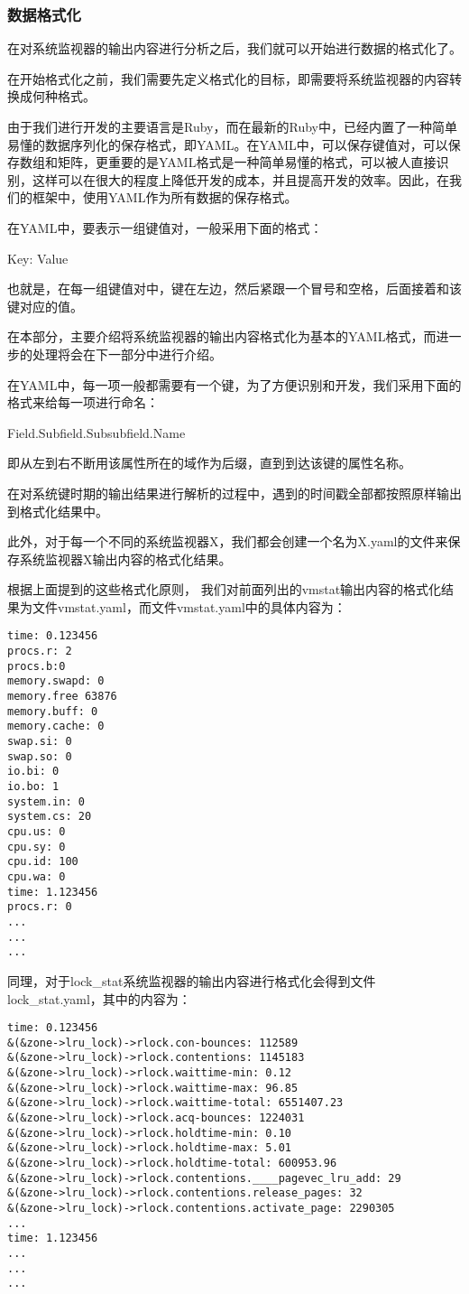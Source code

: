 \subsubsection{数据格式化}
在对系统监视器的输出内容进行分析之后，我们就可以开始进行数据的格式化了。

在开始格式化之前，我们需要先定义格式化的目标，即需要将系统监视器的内容转换成何种格式。

由于我们进行开发的主要语言是Ruby，而在最新的Ruby中，已经内置了一种简单易懂的数据序列化的保存格式，即YAML。在YAML中，可以保存键值对，可以保存数组和矩阵，更重要的是YAML格式是一种简单易懂的格式，可以被人直接识别，这样可以在很大的程度上降低开发的成本，并且提高开发的效率。因此，在我们的框架中，使用YAML作为所有数据的保存格式。

在YAML中，要表示一组键值对，一般采用下面的格式：
\begin{center}
Key: Value
\end{center}
也就是，在每一组键值对中，键在左边，然后紧跟一个冒号和空格，后面接着和该键对应的值。

在本部分，主要介绍将系统监视器的输出内容格式化为基本的YAML格式，而进一步的处理将会在下一部分中进行介绍。

在YAML中，每一项一般都需要有一个键，为了方便识别和开发，我们采用下面的格式来给每一项进行命名：
\begin{center}
Field.Subfield.Subsubfield.Name
\end{center}
即从左到右不断用该属性所在的域作为后缀，直到到达该键的属性名称。

在对系统键时期的输出结果进行解析的过程中，遇到的时间戳全部都按照原样输出到格式化结果中。

此外，对于每一个不同的系统监视器X，我们都会创建一个名为X.yaml的文件来保存系统监视器X输出内容的格式化结果。

根据上面提到的这些格式化原则， 我们对前面列出的vmstat输出内容的格式化结果为文件vmstat.yaml，而文件vmstat.yaml中的具体内容为：
{\footnotesize
\begin{verbatim}
time: 0.123456
procs.r: 2
procs.b:0
memory.swapd: 0
memory.free 63876
memory.buff: 0
memory.cache: 0
swap.si: 0
swap.so: 0
io.bi: 0
io.bo: 1
system.in: 0
system.cs: 20
cpu.us: 0
cpu.sy: 0
cpu.id: 100
cpu.wa: 0
time: 1.123456
procs.r: 0
...
...
...
\end{verbatim}
}

同理，对于lock\_stat系统监视器的输出内容进行格式化会得到文件lock\_stat.yaml，其中的内容为：
{\footnotesize
\begin{verbatim}
time: 0.123456
&(&zone->lru_lock)->rlock.con-bounces: 112589
&(&zone->lru_lock)->rlock.contentions: 1145183
&(&zone->lru_lock)->rlock.waittime-min: 0.12
&(&zone->lru_lock)->rlock.waittime-max: 96.85
&(&zone->lru_lock)->rlock.waittime-total: 6551407.23
&(&zone->lru_lock)->rlock.acq-bounces: 1224031
&(&zone->lru_lock)->rlock.holdtime-min: 0.10
&(&zone->lru_lock)->rlock.holdtime-max: 5.01
&(&zone->lru_lock)->rlock.holdtime-total: 600953.96
&(&zone->lru_lock)->rlock.contentions.____pagevec_lru_add: 29
&(&zone->lru_lock)->rlock.contentions.release_pages: 32
&(&zone->lru_lock)->rlock.contentions.activate_page: 2290305
...
time: 1.123456
...
...
...
\end{verbatim}
}

